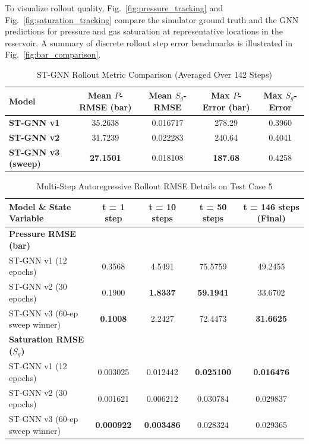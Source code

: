 \documentclass[10pt,twocolumn]{article}
\begin{document}
To visualize rollout quality, Fig.~\ref{fig:pressure_tracking} and Fig.~\ref{fig:saturation_tracking} compare the simulator ground truth and the GNN predictions for pressure and gas saturation at representative locations in the reservoir. A summary of discrete rollout step error benchmarks is illustrated in Fig.~\ref{fig:bar_comparison}.

\begin{table}[t]
\centering
\caption{ST-GNN Rollout Metric Comparison (Averaged Over 142 Steps)}
\label{tab:stgnn_comparison}
\begin{tabular}{lcccc}
\toprule
\textbf{Model} & \textbf{Mean $P$-RMSE (bar)} & \textbf{Mean $S_g$-RMSE} & \textbf{Max $P$-Error (bar)} & \textbf{Max $S_g$-Error} \\
\midrule
\textbf{ST-GNN v1} & 35.2638 & 0.016717 & 278.29 & 0.3960 \\
\textbf{ST-GNN v2} & 31.7239 & 0.022283 & 240.64 & 0.4041 \\
\textbf{ST-GNN v3 (sweep)} & \textbf{27.1501} & 0.018108 & \textbf{187.68} & 0.4258 \\
\bottomrule
\end{tabular}
\end{table}

\begin{table}[h]
\centering
\caption{Multi-Step Autoregressive Rollout RMSE Details on Test Case 5}
\label{tab:rollout_metrics}
\begin{tabular}{lcccc}
\toprule
\textbf{Model \& State Variable} & \textbf{t = 1 step} & \textbf{t = 10 steps} & \textbf{t = 50 steps} & \textbf{t = 146 steps (Final)} \\
\midrule
\textbf{Pressure RMSE (bar)} \\
ST-GNN v1 (12 epochs) & 0.3568 & 4.5491 & 75.5759 & 49.2455 \\
ST-GNN v2 (30 epochs) & 0.1900 & \textbf{1.8337} & \textbf{59.1941} & 33.6702 \\
ST-GNN v3 (60-ep sweep winner) & \textbf{0.1008} & 2.2427 & 72.4473 & \textbf{31.6625} \\
\midrule
\textbf{Saturation RMSE ($S_g$)} \\
ST-GNN v1 (12 epochs) & 0.003025 & 0.012442 & \textbf{0.025100} & \textbf{0.016476} \\
ST-GNN v2 (30 epochs) & 0.001621 & 0.006212 & 0.030784 & 0.029837 \\
ST-GNN v3 (60-ep sweep winner) & \textbf{0.000922} & \textbf{0.003486} & 0.028324 & 0.029365 \\
\bottomrule
\end{tabular}
\end{table}
\end{document}
